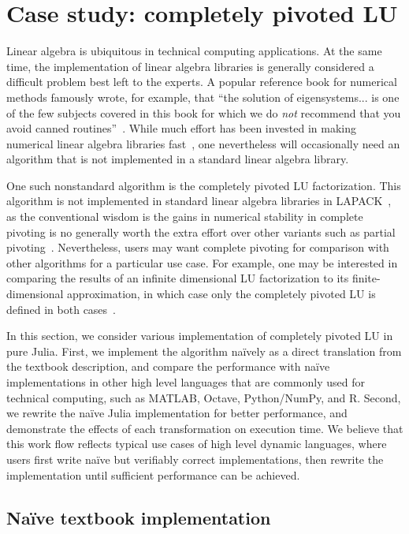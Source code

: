 \section{Case study: completely pivoted LU}

Linear algebra is ubiquitous in technical computing applications. At the same
time, the implementation of linear algebra libraries is generally considered a
difficult problem best left to the experts. A popular reference book for
numerical methods famously wrote, for example, that ``the solution of
eigensystems... is one of the few subjects covered in this book for which we do
\textit{not} recommend that you avoid canned routines''~\cite[Section 11.0, p.
461]{Press1992}. While much effort has been invested in making
numerical linear algebra libraries
fast~\cite{lapack,Gunnels2001,OpenBLAS,VanZee2013}, one nevertheless will
occasionally need an algorithm that is not implemented in a
standard linear algebra library.

One such nonstandard algorithm is the completely pivoted LU factorization. This
algorithm is not implemented in standard linear algebra libraries in
LAPACK~\cite{lapack}, as the conventional wisdom is the gains in numerical
stability in complete pivoting is no generally worth the extra effort over
other variants such as partial pivoting~\cite{Golub2013}.  Nevertheless, users
may want complete pivoting for comparison with other algorithms for a
particular use case. For example, one may be interested in comparing the
results of an infinite dimensional LU factorization to its finite-dimensional
approximation, in which case only the completely pivoted LU is defined in both
cases~\cite{Townsend2014}.

In this section, we consider various implementation of completely pivoted LU in
pure Julia. First, we implement the algorithm na\"ively as a direct translation
from the textbook description, and compare the performance with na\"ive
implementations in other high level languages that are commonly used for
technical computing, such as MATLAB, Octave, Python/NumPy, and R. Second, we
rewrite the na\"ive Julia implementation for better performance, and
demonstrate the effects of each transformation on execution time. We believe
that this work flow reflects typical use cases of high level dynamic languages,
where users first write na\"ive but verifiably correct implementations, then
rewrite the implementation until sufficient performance can be achieved.



\subsection{Na\"ive textbook implementation}

